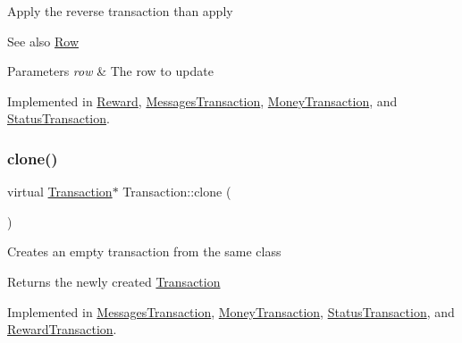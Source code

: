 Apply the reverse transaction than apply \begin{DoxySeeAlso}{See also}
\mbox{\hyperlink{classRow}{Row}}
\end{DoxySeeAlso}

\begin{DoxyParams}{Parameters}
{\em row} & The row to update \\
\hline
\end{DoxyParams}


Implemented in \mbox{\hyperlink{classReward_a494c9d6e0a220729f675fd6131cfb9af}{Reward}}, \mbox{\hyperlink{classMessagesTransaction_ad44d1a3d26383c153360d3836606b7ce}{Messages\+Transaction}}, \mbox{\hyperlink{classMoneyTransaction_a9eaa71eed1cc8b06ef5773c76c814ad9}{Money\+Transaction}}, and \mbox{\hyperlink{classStatusTransaction_abbb21cfeacda7753503f1fabeb9a3a87}{Status\+Transaction}}.

\mbox{\label{classTransaction_ad6ee9c5e4067b2f5c950c6aad131b3e4}} 
\subsubsection{\texorpdfstring{clone()}{clone()}}
{\footnotesize\ttfamily virtual \mbox{\hyperlink{classTransaction}{Transaction}}$\ast$ Transaction\+::clone (\begin{DoxyParamCaption}{ }\end{DoxyParamCaption})\hspace{0.3cm}{\ttfamily [pure virtual]}}

Creates an empty transaction from the same class

\begin{DoxyReturn}{Returns}
the newly created \mbox{\hyperlink{classTransaction}{Transaction}} 
\end{DoxyReturn}


Implemented in \mbox{\hyperlink{classMessagesTransaction_a290e38ea445bba3f62956c660607c03f}{Messages\+Transaction}}, \mbox{\hyperlink{classMoneyTransaction_af777b46f577df3c089a44c78c1aebc40}{Money\+Transaction}}, \mbox{\hyperlink{classStatusTransaction_ac920c5dfe6f75a650e74b92899310400}{Status\+Transaction}}, and \mbox{\hyperlink{classRewardTransaction_a414728d857fcf05295a7f3f4fa024dc1}{Reward\+Transaction}}.

\mbox{\label{classTransaction_aa80b621537fe480dcb4444bba703abe5}} 
